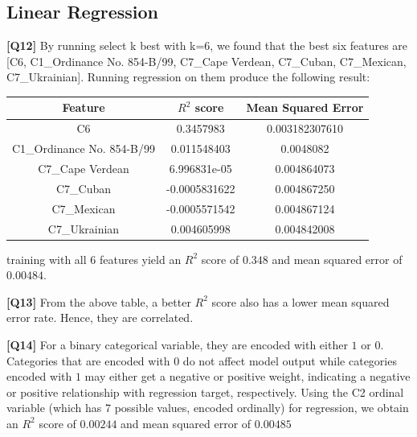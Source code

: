\documentclass{article}
\begin{document}
\begin{description}
		\subsection*{Linear Regression}
	\item \textbf{[Q12]} By running select k best with k=6, we found that the best six features are [C6, C1\_Ordinance No. 854-B/99, C7\_Cape Verdean, C7\_Cuban, C7\_Mexican, C7\_Ukrainian]. Running regression on them produce the following result:
		\begin{center}
			\begin{tabular}{|c|c|c|}
				\hline
				Feature & $R^2$ score & Mean Squared Error \\
				\hline
				C6 & 0.3457983 & 0.003182307610 \\
				C1\_Ordinance No. 854-B/99 & 0.011548403 & 0.0048082 \\
				C7\_Cape Verdean & 6.996831e-05 & 0.004864073 \\
				C7\_Cuban & -0.0005831622 & 0.004867250 \\
				C7\_Mexican & -0.0005571542 & 0.004867124 \\
				C7\_Ukrainian & 0.004605998 & 0.004842008 \\
				\hline
			\end{tabular}
		\end{center}
		training with all 6 features yield an $R^2$ score of $0.348$ and mean squared error of $0.00484$.
	\item \textbf{[Q13]} From the above table, a better $R^2$ score also has a lower mean squared error rate. Hence, they are correlated.
	\item \textbf{[Q14]} For a binary categorical variable, they are encoded with either $1$ or $0$.  Categories that are encoded with $0$ do not affect model output while categories encoded with $1$ may either get a negative or positive weight, indicating a negative or positive relationship with regression target, respectively.
	Using the C2 ordinal variable (which has 7 possible values, encoded ordinally) for regression, we obtain an $R^2$ score of $0.00244$ and mean squared error of $0.00485$

\end{description}
\end{document}
